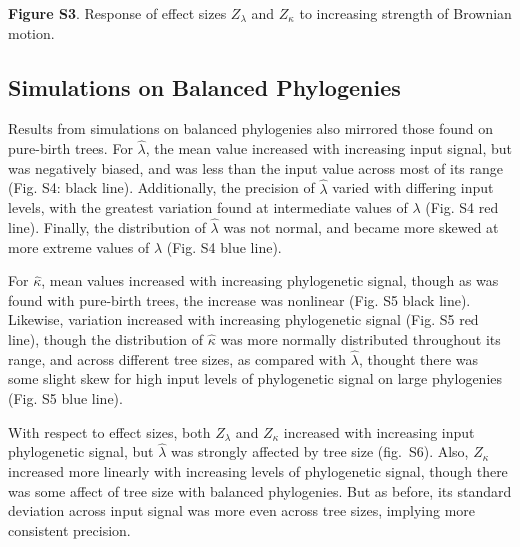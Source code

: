 \documentclass[
]{article}
\begin{document}
\textbf{Figure S3}. Response of effect sizes \(Z_{\lambda}\) and
\(Z_{\kappa}\) to increasing strength of Brownian motion.

\newpage

\hypertarget{simulations-on-balanced-phylogenies}{%
\subsection{Simulations on Balanced
Phylogenies}\label{simulations-on-balanced-phylogenies}}

Results from simulations on balanced phylogenies also mirrored those
found on pure-birth trees. For \(\hat{\lambda}\), the mean value
increased with increasing input signal, but was negatively biased, and
was less than the input value across most of its range (Fig. S4: black
line). Additionally, the precision of \(\hat{\lambda}\) varied with
differing input levels, with the greatest variation found at
intermediate values of \(\lambda\) (Fig. S4 red line). Finally, the
distribution of \(\hat{\lambda}\) was not normal, and became more skewed
at more extreme values of \(\lambda\) (Fig. S4 blue line). \hfill\break

For \(\hat\kappa\), mean values increased with increasing phylogenetic
signal, though as was found with pure-birth trees, the increase was
nonlinear (Fig. S5 black line). Likewise, variation increased with
increasing phylogenetic signal (Fig. S5 red line), though the
distribution of \(\hat\kappa\) was more normally distributed throughout
its range, and across different tree sizes, as compared with
\(\hat{\lambda}\), thought there was some slight skew for high input
levels of phylogenetic signal on large phylogenies (Fig. S5 blue line).
\hfill\break

With respect to effect sizes, both \(Z_{\lambda}\) and \(Z_{\kappa}\)
increased with increasing input phylogenetic signal, but
\(\hat{\lambda}\) was strongly affected by tree size (fig.~S6). Also,
\(Z_{\kappa}\) increased more linearly with increasing levels of
phylogenetic signal, though there was some affect of tree size with
balanced phylogenies. But as before, its standard deviation across input
signal was more even across tree sizes, implying more consistent
precision.
\end{document}
